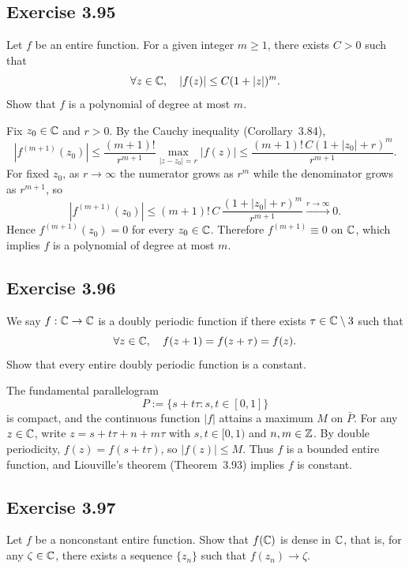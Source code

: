 \documentclass{article}
\begin{document}
\subsection{Exercise 3.95}
\label{sec:ca-ex-3-95}

Let $f$ be an entire function. For a given integer $m \ge 1$,
there exists $C > 0$ such that
\[
  \forall z \in \mathbb{C},\quad |f(z)| \le C(1 + |z|)^m.
\]
Show that $f$ is a polynomial of degree at most $m$.

\begin{solution}
  Fix $z_0 \in \mathbb{C}$ and $r > 0$.
  By the Cauchy inequality (Corollary~3.84),
  \[
    |f^{(m+1)}(z_0)|
    \le \frac{(m+1)!}{r^{m+1}}\max_{|z-z_0|=r}|f(z)|
    \le \frac{(m+1)!\,C(1+|z_0|+r)^m}{r^{m+1}}.
  \]
  For fixed $z_0$, as $r \to \infty$ the numerator grows as
  $r^m$ while the denominator grows as $r^{m+1}$, so
  \[
    |f^{(m+1)}(z_0)|
    \le (m+1)!\,C\,\frac{(1+|z_0|+r)^m}{r^{m+1}}
    \xrightarrow{r\to\infty}0.
  \]
  Hence $f^{(m+1)}(z_0) = 0$ for every $z_0 \in \mathbb{C}$.
  Therefore $f^{(m+1)} \equiv 0$ on $\mathbb{C}$, which implies
  $f$ is a polynomial of degree at most $m$.\qedhere
\end{solution}

\subsection{Exercise 3.96}

We say $f : \mathbb{C} \to \mathbb{C}$ is a doubly periodic function if there
exists $\tau \in \mathbb{C} \setminus 3$ such that
\[
  \forall z \in \mathbb{C},\quad f(z + 1) = f(z + \tau) = f(z).
\]
Show that every entire doubly periodic function is a constant.

\begin{solution}
  The fundamental parallelogram
  \[
    P := \{s + t\tau : s,t \in [0,1]\}
  \]
  is compact, and the continuous function $|f|$ attains a maximum
  $M$ on $\bar{P}$.
  For any $z \in \mathbb{C}$, write $z = s + t\tau + n + m\tau$ with
  $s,t \in [0,1)$ and $n,m \in \mathbb{Z}$.
  By double periodicity,
  $f(z) = f(s + t\tau)$, so $|f(z)| \le M$.
  Thus $f$ is a bounded entire function, and Liouville's theorem
  (Theorem~3.93) implies $f$ is constant.\qedhere
\end{solution}

\subsection{Exercise 3.97}

Let $f$ be a nonconstant entire function. Show that $f(\mathbb{C})$ is
dense in $\mathbb{C}$, that is, for any $\zeta \in \mathbb{C}$, there exists a
sequence $\{z_n\}$ such that $f(z_n) \to \zeta$.
\end{document}
